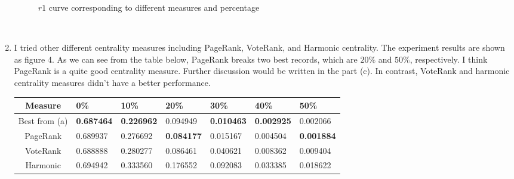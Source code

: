 \documentclass[12pt]{article}
\begin{document}
\begin{enumerate}[label=(\alph*)]
\begin{figure}[htbp]
{				\label{r1_box}
			}
			\caption{$r1$ curve corresponding to different measures and percentage}
		\end{figure}
	\\
	\item I tried other different centrality measures including PageRank, VoteRank, and Harmonic centrality. The experiment results are shown as figure 4. As we can see from the table below, PageRank breaks two best records, which are $20\%$ and $50\%$, respectively. I think PageRank is a quite good centrality measure. Further discussion would be written in the part (c). In contrast, VoteRank and harmonic centrality measures didn't have a better performance. \\ [1em]
		\begin{tabular}{|c|l|l|l|l|l|l|}
			\hline
			Measure       & 0\% & 10\% & 20\% & 30\% & 40\% & 50\% \\ \hline
			Best from (a) & \textbf{0.687464} & \textbf{0.226962} & 0.094949 & \textbf{0.010463} & \textbf{0.002925} & 0.002066 \\ \hline
			PageRank      & 0.689937 & 0.276692 & \textbf{0.084177} & 0.015167 & 0.004504 & \textbf{0.001884} \\ \hline
			VoteRank      & 0.688888 & 0.280277 & 0.086461 & 0.040621 & 0.008362 & 0.009404 \\ \hline
			Harmonic      & 0.694942 & 0.333560 & 0.176552 & 0.092083 & 0.033385 & 0.018622
			 \\ \hline
		\end{tabular} \\
		\begin{figure}[htbp]
			\centering
			\quad
\end{figure}
\end{enumerate}
\end{document}
